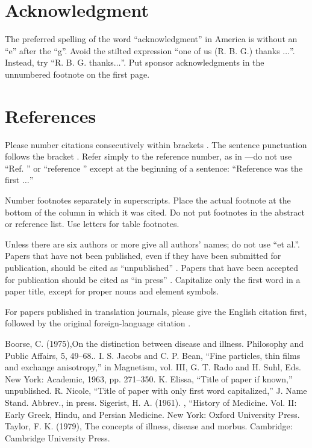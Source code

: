 \documentclass[conference]{IEEEtran}
\begin{document}
\section*{Acknowledgment}

The preferred spelling of the word ``acknowledgment'' in America is without 
an ``e'' after the ``g''. Avoid the stilted expression ``one of us (R. B. 
G.) thanks $\ldots$''. Instead, try ``R. B. G. thanks$\ldots$''. Put sponsor 
acknowledgments in the unnumbered footnote on the first page.

\section*{References}

Please number citations consecutively within brackets \cite{b1}. The 
sentence punctuation follows the bracket \cite{b2}. Refer simply to the reference 
number, as in \cite{b3}---do not use ``Ref. \cite{b3}'' or ``reference \cite{b3}'' except at 
the beginning of a sentence: ``Reference \cite{b3} was the first $\ldots$''

Number footnotes separately in superscripts. Place the actual footnote at 
the bottom of the column in which it was cited. Do not put footnotes in the 
abstract or reference list. Use letters for table footnotes.

Unless there are six authors or more give all authors' names; do not use 
``et al.''. Papers that have not been published, even if they have been 
submitted for publication, should be cited as ``unpublished'' \cite{b4}. Papers 
that have been accepted for publication should be cited as ``in press'' \cite{b5}. 
Capitalize only the first word in a paper title, except for proper nouns and 
element symbols.

For papers published in translation journals, please give the English 
citation first, followed by the original foreign-language citation \cite{b6}.

\begin{thebibliography}{00}

 Boorse, C. (1975),On the distinction between disease and illness. Philosophy and Public Affairs, 5, 49–68..
 I. S. Jacobs and C. P. Bean, ``Fine particles, thin films and exchange anisotropy,'' in Magnetism, vol. III, G. T. Rado and H. Suhl, Eds. New York: Academic, 1963, pp. 271--350.
 K. Elissa, ``Title of paper if known,'' unpublished.
 R. Nicole, ``Title of paper with only first word capitalized,'' J. Name Stand. Abbrev., in press.
Sigerist, H. A. (1961). , ``History of Medicine. Vol. II: Early Greek, Hindu, and Persian Medicine. New York: Oxford University Press.
Taylor, F. K. (1979), The concepts of illness, disease and morbus. Cambridge: Cambridge University Press.
\end{thebibliography}
\end{document}
